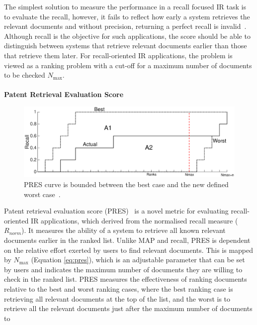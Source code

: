 The simplest solution to measure the performance in a recall focused IR task is to evaluate the recall, however, it fails to reflect how early a system retrieves the relevant documents and without precision, returning a perfect recall is invalid~\citep{Suominen08t.:critical}. Although recall is the objective for such applications, the score should be able to distinguish between systems that retrieve relevant documents earlier than those that retrieve them later. For recall-oriented IR applications, the problem is viewed as a ranking problem with a cut-off for a maximum number of documents to be checked $ N_{\max} $.\\\\
\textbf{Patent Retrieval Evaluation Score}
\ \\
\begin{figure}[t!]
   \centering
   \includegraphics[scale=.31]{figs/pres.eps}
   \caption{PRES curve is bounded between the best case and the new defined worst case~\citep{magdy2010pres}.}  
   \label{fig:pres} 
\end{figure}
%
Patent retrieval evaluation score (PRES)~\citep{magdy2010pres} is a novel metric for evaluating recall-oriented IR applications, which derived from the normalised recall measure ($ R_{norm} $). It measures the ability of a system to retrieve all known relevant documents earlier in the ranked list. Unlike MAP and recall, PRES is dependent on the relative effort exerted by users to find relevant documents. This is mapped by $ N_{\max} $ (Equation \ref{eq:pres}), which is an adjustable parameter that can be set by users and indicates the maximum number of documents they are willing to check in the ranked list. PRES measures the effectiveness of ranking documents relative to the best and worst ranking cases, where the best ranking case is retrieving all relevant documents at the top of the list, and the worst is to retrieve all the relevant documents just after the maximum number of documents to
